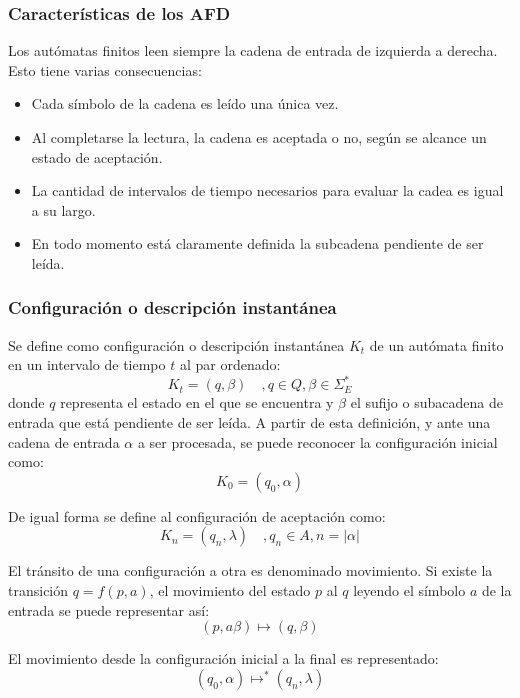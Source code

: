 \documentclass[12pt]{article}
\begin{document}
\subsubsection{Características de los AFD}
Los autómatas finitos leen siempre la cadena de entrada de izquierda a derecha. Esto tiene varias consecuencias:
\begin{itemize}
  \item Cada símbolo de la cadena es leído una única vez.

  \item Al completarse la lectura, la cadena es aceptada o no, según se alcance un estado de aceptación.

  \item La cantidad de intervalos de tiempo necesarios para evaluar la cadea es igual a su largo.

  \item En todo momento está claramente definida la subcadena pendiente de ser leída.
\end{itemize}

\subsubsection{Configuración o descripción instantánea}
Se define como configuración o descripción instantánea $ K_{t} $ de un autómata finito en un intervalo de tiempo $ t $ al par ordenado: 
\[
K_{t} = (q,\beta) \quad ,q \in Q, \beta \in \Sigma_{E}^{*}
\]
donde $ q $ representa el estado en el que se encuentra y $ \beta $ el sufijo o subacadena de entrada que está pendiente de ser leída. A partir de esta definición, y ante una cadena de entrada $ \alpha $ a ser procesada, se puede reconocer la configuración inicial como:
\[
K_{0}=(q_{0},\alpha)
\]

De igual forma se define al configuración de aceptación como:
\[
K_{n} = (q_{n}, \lambda) \quad ,q_{n} \in A,n= \left|\alpha\right|
\]

El tránsito de una configuración a otra es denominado movimiento. Si existe la transición $ q=f(p,a) $, el movimiento del estado $ p $ al $ q $ leyendo el símbolo $ a $ de la entrada se puede representar así:
\[
	(p,a\beta) \mapsto (q,\beta)
\]

El movimiento desde la configuración inicial a la final es representado:
\[
	(q_{0},\alpha) \mapsto^{*} (q_{n},\lambda)
\]
\end{document}
